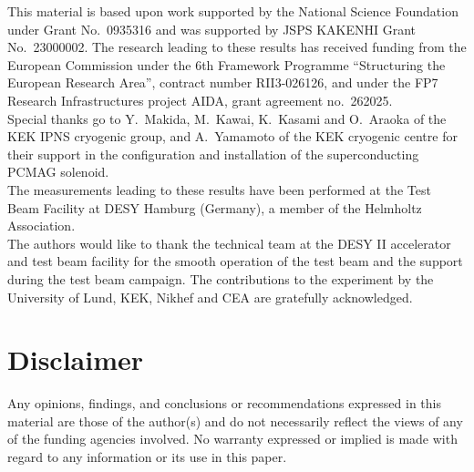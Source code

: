 \documentclass[preprint]{elsarticle}
\begin{document}
This material is based upon work supported by the National Science Foundation under Grant No.~0935316 and was supported by JSPS KAKENHI Grant No.~23000002. The research leading to these results has received funding from the European Commission under the 6th Framework Programme ``Structuring the European Research Area'', contract number RII3-026126, and under the FP7 Research Infrastructures project AIDA, grant agreement no.~262025.\\
Special thanks go to Y.~Makida, M.~Kawai, K.~Kasami and O.~Araoka of the KEK IPNS cryogenic group, and A.~Yamamoto of the KEK cryogenic centre for their support in the configuration and installation of the superconducting PCMAG solenoid. \\
The measurements leading to these results have been performed at the Test Beam Facility at DESY Hamburg (Germany), a member of the Helmholtz Association.\\
The authors would like to thank the technical team at the DESY II accelerator and test beam facility for the smooth operation of the test beam and the support during the test beam campaign. The contributions to the experiment by the University of Lund, KEK, Nikhef and CEA are gratefully acknowledged.

\section{Disclaimer}
Any opinions, findings, and conclusions or recommendations expressed in this material are those of the author(s) and do not necessarily reflect the views of any of the funding agencies involved. No warranty expressed or implied is made with regard to any information or its use in this paper.




\end{document}
